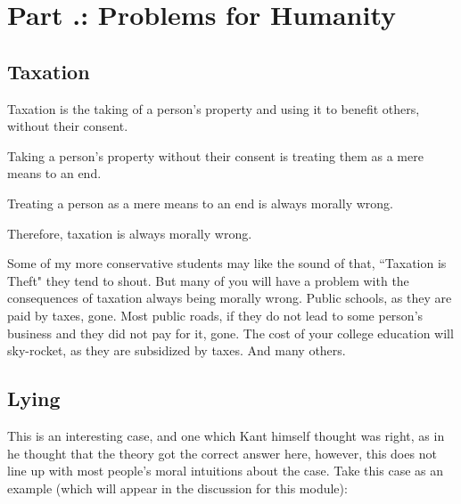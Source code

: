 \section{Part \thechapcount.\theseccount: Problems for Humanity}
\subsection{Taxation}
\begin{earg}
    \item[] Taxation is the taking of a person’s property and using it to benefit others, without their consent.
    \item[] Taking a person’s property without their consent is treating them as a mere means to an end.
    \item[] Treating a person as a mere means to an end is always morally wrong.
    \item[] Therefore, taxation is always morally wrong.
\end{earg}
Some of my more conservative students may like the sound of that, ``Taxation is Theft" they tend to shout. But many of you will have a problem with the consequences of taxation always being morally wrong. Public schools, as they are paid by taxes, gone. Most public roads, if they do not lead to some person's business and they did not pay for it, gone. The cost of your college education will sky-rocket, as they are subsidized by taxes. And many others.
\subsection{Lying}

This is an interesting case, and one which Kant himself thought was right, as in he thought that the theory got the correct answer here, however, this does not line up with most people's moral intuitions about the case. Take this case as an example (which will appear in the discussion for this module):


